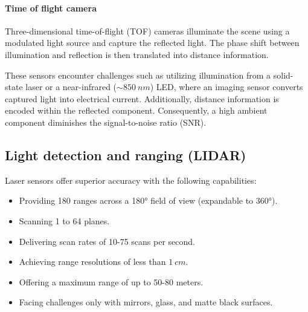 \paragraph*{Time of flight camera}
Three-dimensional time-of-flight (TOF) cameras illuminate the scene using a modulated light source and capture the reflected light. 
The phase shift between illumination and reflection is then translated into distance information.

These sensors encounter challenges such as utilizing illumination from a solid-state laser or a near-infrared ($\sim 850 \: nm$) LED, where an imaging sensor converts captured light into electrical current. 
Additionally, distance information is encoded within the reflected component. 
Consequently, a high ambient component diminishes the signal-to-noise ratio (SNR).

\subsection{Light detection and ranging (LIDAR)}
Laser sensors offer superior accuracy with the following capabilities:
\begin{itemize}
    \item Providing 180 ranges across a 180° field of view (expandable to 360°).
    \item Scanning 1 to 64 planes.
    \item Delivering scan rates of 10-75 scans per second.
    \item Achieving range resolutions of less than $1\:cm$.
    \item Offering a maximum range of up to 50-80 meters.
    \item Facing challenges only with mirrors, glass, and matte black surfaces.
\end{itemize}
